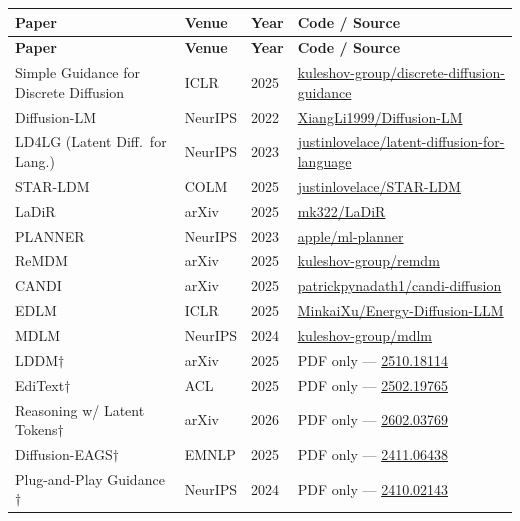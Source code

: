 \documentclass{article}
\begin{document}
\begin{longtable}{@{}p{5.5cm}llp{5cm}@{}}
\toprule
\textbf{Paper} & \textbf{Venue} & \textbf{Year} & \textbf{Code / Source} \\
\midrule
\endfirsthead
\toprule
\textbf{Paper} & \textbf{Venue} & \textbf{Year} & \textbf{Code / Source} \\
\midrule
\endhead
\bottomrule
\endfoot
Simple Guidance for Discrete Diffusion & ICLR & 2025 & \href{https://github.com/kuleshov-group/discrete-diffusion-guidance}{kuleshov-group/discrete-diffusion-guidance} \\
Diffusion-LM & NeurIPS & 2022 & \href{https://github.com/XiangLi1999/Diffusion-LM}{XiangLi1999/Diffusion-LM} \\
LD4LG (Latent Diff.\ for Lang.) & NeurIPS & 2023 & \href{https://github.com/justinlovelace/latent-diffusion-for-language}{justinlovelace/latent-diffusion-for-language} \\
STAR-LDM & COLM & 2025 & \href{https://github.com/justinlovelace/STAR-LDM}{justinlovelace/STAR-LDM} \\
LaDiR & arXiv & 2025 & \href{https://github.com/mk322/LaDiR}{mk322/LaDiR} \\
PLANNER & NeurIPS & 2023 & \href{https://github.com/apple/ml-planner}{apple/ml-planner} \\
ReMDM & arXiv & 2025 & \href{https://github.com/kuleshov-group/remdm}{kuleshov-group/remdm} \\
CANDI & arXiv & 2025 & \href{https://github.com/patrickpynadath1/candi-diffusion}{patrickpynadath1/candi-diffusion} \\
EDLM & ICLR & 2025 & \href{https://github.com/MinkaiXu/Energy-Diffusion-LLM}{MinkaiXu/Energy-Diffusion-LLM} \\
MDLM & NeurIPS & 2024 & \href{https://github.com/kuleshov-group/mdlm}{kuleshov-group/mdlm} \\
\midrule
LDDM$\dagger$ & arXiv & 2025 & PDF only --- \href{https://arxiv.org/abs/2510.18114}{2510.18114} \\
EdiText$\dagger$ & ACL & 2025 & PDF only --- \href{https://arxiv.org/abs/2502.19765}{2502.19765} \\
Reasoning w/ Latent Tokens$\dagger$ & arXiv & 2026 & PDF only --- \href{https://arxiv.org/abs/2602.03769}{2602.03769} \\
Diffusion-EAGS$\dagger$ & EMNLP & 2025 & PDF only --- \href{https://arxiv.org/abs/2411.06438}{2411.06438} \\
Plug-and-Play Guidance$\dagger$ & NeurIPS & 2024 & PDF only --- \href{https://arxiv.org/abs/2410.02143}{2410.02143} \\

\end{longtable}
\end{document}
